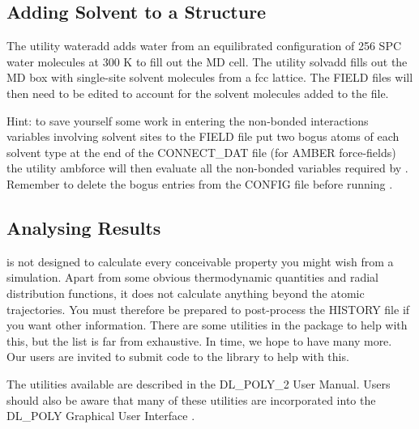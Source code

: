 \subsection{Adding Solvent to a Structure}

The utility {\sc wateradd} adds water from an equilibrated
configuration of 256 SPC water molecules at 300 K to fill out the
MD cell.  The utility {\sc solvadd} fills out the MD box with
single-site solvent molecules from a fcc lattice.  The FIELD files
will then need to be edited to account for the solvent molecules
added to the file.

Hint: to save yourself some work in entering the non-bonded
interactions variables involving solvent sites to the FIELD file put
two bogus atoms of each solvent type at the end of the CONNECT\_DAT
file (for AMBER force-fields) the
utility {\sc ambforce} will then evaluate all the
non-bonded variables required by \D.
Remember to delete the bogus entries from the CONFIG file before
running \D.

\subsection{Analysing Results}

\D is not designed to calculate every conceivable property you
might wish from a simulation.  Apart from some obvious
thermodynamic quantities and radial distribution functions, it
does not calculate anything beyond the atomic trajectories.  You
must therefore be prepared to post-process the HISTORY file if you
want other information.  There are some utilities in the \D
package to help with this, but the list is far from exhaustive. In
time, we hope to have many more.  Our users are invited to submit
code to the  library to help with this.

The utilities available are described in the DL\_POLY\_2 User
Manual.  Users should also be aware that many of these utilities are
incorporated into the DL\_POLY Graphical User
Interface \cite{smith-gui}.

